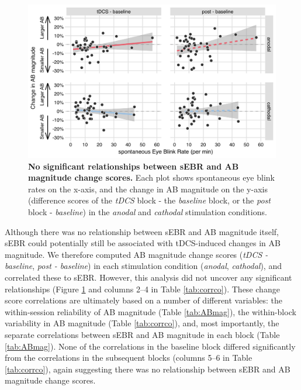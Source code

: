 \documentclass[11pt,english,]{memoir}
\begin{document}
\begin{figure}
\includegraphics[width=130mm]{AB_sEBR_files/figures/figure_6_tDCS-corr} \caption{\textbf{No significant relationships between sEBR and AB magnitude change scores.} Each plot shows spontaneous eye blink rates on the x-axis, and the change in AB magnitude on the y-axis (difference scores of the \emph{tDCS} block - the \emph{baseline} block, or the \emph{post} block - \emph{baseline}) in the \emph{anodal} and \emph{cathodal} stimulation conditions.}\label{fig:fig-tDCS-corr}
\end{figure}



Although there was no relationship between sEBR and AB magnitude itself, sEBR could potentially still be associated with tDCS-induced changes in AB magnitude. We therefore computed AB magnitude change scores (\emph{tDCS - baseline}, \emph{post - baseline}) in each stimulation condition (\emph{anodal}, \emph{cathodal}), and correlated these to sEBR. However, this analysis did not uncover any significant relationships (Figure \ref{fig:fig-tDCS-corr} and columns 2--4 in Table \ref{tab:corrco}). These change score correlations are ultimately based on a number of different variables: the within-session reliability of AB magnitude (Table \ref{tab:ABmag}), the within-block variability in AB magnitude (Table \ref{tab:corrco}), and, most importantly, the separate correlations between sEBR and AB magnitude in each block (Table \ref{tab:ABmag}). None of the correlations in the baseline block differed significantly from the correlations in the subsequent blocks (columns 5--6 in Table \ref{tab:corrco}), again suggesting there was no relationship between sEBR and AB magnitude change scores.
\end{document}
